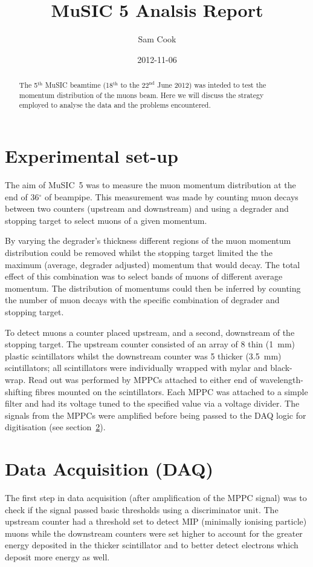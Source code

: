 \documentclass[]{article}
\title{MuSIC 5 Analsis Report}
\author{Sam Cook}
\date{2012-11-06}
\newcommand{\nth}[1]{#1\(^\text{th}\)}
\newcommand{\nthTwo}[2]{\(#1^\text{#2}\)}
\begin{document}
\ifpdf
{}
\else
{}
\fi

\maketitle


\begin{abstract}
	The \nth{5} MuSIC beamtime (\nth{18} to the \nthTwo{22}{nd} June 2012) was inteded to test the momentum distribution of the muons beam. Here we will discuss the strategy employed to analyse the data and the problems encountered.
\end{abstract}

\section{Experimental set-up}\label{sec:set-up}
The aim of MuSIC~5 was to measure the muon momentum distribution at the end of 36\(^{\circ}\) of beampipe. This measurement was made by counting muon decays between two counters (upstream and downstream) and using a degrader and stopping target to select muons of a given momentum. 

By varying the degrader's thickness different regions of the muon momentum distribution could be removed whilst the stopping target limited the the maximum (average, degrader adjusted) momentum that would decay. The total effect of this combination was to select bands of muons of different average momentum. The distribution of momentums could then be inferred by counting the number of muon decays with the specific combination of degrader and stopping target. 

To detect muons a counter placed upstream, and a second, downstream of the stopping target. The upstream counter consisted of an array of 8 thin (1~mm) plastic scintillators whilst the downstream counter was 5 thicker (3.5~mm) scintillators; all scintillators were individually wrapped with mylar and black-wrap. Read out was performed by MPPCs attached to either end of wavelength-shifting fibres mounted on the scintillators. Each MPPC was attached to a simple filter and had its voltage tuned to the specified value via a voltage divider. The signals from the MPPCs were amplified before being passed to the DAQ logic for digitisation (see section~\ref{sec:daq}).

\section{Data Acquisition (DAQ)}\label{sec:daq}
The first step in data acquisition (after amplification of the MPPC signal) was to check if the signal passed basic thresholds using a discriminator unit. The upstream counter had a threshold set to detect MIP (minimally ionising particle) muons while the downstream counters were set higher to account for the greater energy deposited in the thicker scintillator and to better detect electrons which deposit more energy as well. 
\end{document}
